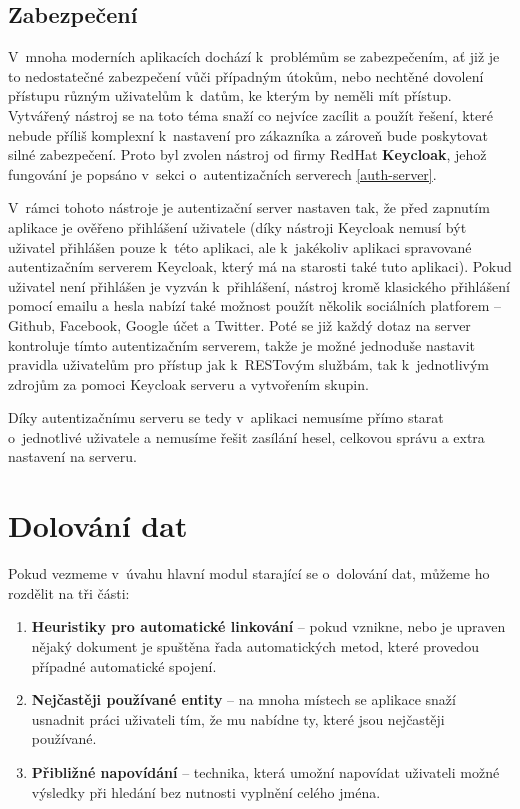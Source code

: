 \subsection{Zabezpečení}
\par V~mnoha moderních aplikacích dochází k~problémům se zabezpečením, ať již je to nedostatečné zabezpečení vůči případným útokům, nebo nechtěné dovolení přístupu různým uživatelům k~datům, ke kterým by neměli mít přístup. Vytvářený nástroj se na toto téma snaží co nejvíce zacílit a použít řešení, které nebude příliš komplexní k~nastavení pro zákazníka a zároveň bude poskytovat silné zabezpečení. Proto byl zvolen nástroj od firmy RedHat \textbf{Keycloak}, jehož fungování je popsáno v~sekci o~autentizačních serverech \ref{auth-server}.

\par V~rámci tohoto nástroje je autentizační server nastaven tak, že před zapnutím aplikace je ověřeno přihlášení uživatele (díky nástroji Keycloak nemusí být uživatel přihlášen pouze k~této aplikaci, ale k~jakékoliv aplikaci spravované autentizačním serverem Keycloak, který má na starosti také tuto aplikaci). Pokud uživatel není přihlášen je vyzván k~přihlášení, nástroj kromě klasického přihlášení pomocí emailu a hesla nabízí také možnost použít několik sociálních platforem -- Github, Facebook, Google účet a Twitter. Poté se již každý dotaz na server kontroluje tímto autentizačním serverem, takže je možné jednoduše nastavit pravidla uživatelům pro přístup jak k~RESTovým službám, tak k~jednotlivým zdrojům za pomoci Keycloak serveru a vytvořením skupin.

\par Díky autentizačnímu serveru se tedy v~aplikaci nemusíme přímo starat o~jednotlivé uživatele a nemusíme řešit zasílání hesel, celkovou správu a extra nastavení na serveru.

\section{Dolování dat}
\par Pokud vezmeme v~úvahu hlavní modul starající se o~dolování dat, můžeme ho rozdělit na tři části:
\begin{enumerate}
  \item \textbf{Heuristiky pro automatické linkování} -- pokud vznikne, nebo je upraven nějaký dokument je spuštěna řada automatických metod, které provedou případné automatické spojení.
  \item \textbf{Nejčastěji používané entity} -- na mnoha místech se aplikace snaží usnadnit práci uživateli tím, že mu nabídne ty, které jsou nejčastěji používané.
  \item \textbf{Přibližné napovídání} -- technika, která umožní napovídat uživateli možné výsledky při hledání bez nutnosti vyplnění celého jména.
\end{enumerate}

